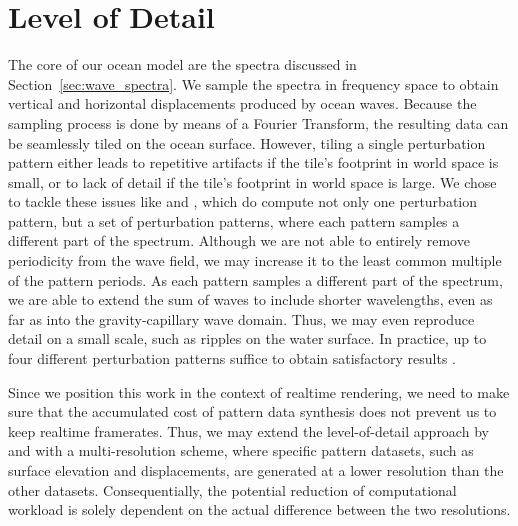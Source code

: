 \section{Level of Detail}
\label{sec:level_of_detail}
The core of our ocean model are the spectra discussed in 
Section~\ref{sec:wave_spectra}. We sample the spectra in 
frequency space to obtain vertical and horizontal displacements produced by 
ocean waves. Because the sampling process is done by means of a Fourier 
Transform, the resulting data can be seamlessly tiled on the ocean surface. 
However, tiling a single perturbation pattern either leads to repetitive 
artifacts if the tile's footprint in world space is small, or to lack of detail 
if the tile's footprint in world space is large. We chose to tackle these 
issues like \citet{misc:oceanlightingfft} and \citet{article:whitecaps},
which do compute not only one perturbation pattern, but a set of perturbation
patterns, where each pattern samples a different part of the spectrum.
Although we are not able to entirely remove periodicity from the wave field, we
may increase it to the least common multiple of the pattern periods.
As each pattern samples a different part of the spectrum, we are able
to extend the sum of waves to include shorter wavelengths, even as far as into the
gravity-capillary wave domain. Thus, we may even reproduce detail on a small
scale, such as ripples on the water surface.
In practice, up to four different perturbation patterns suffice to obtain
satisfactory results \citep{article:whitecaps}.

Since we position this work in the context of realtime rendering,
we need to make sure that the accumulated cost of pattern data synthesis
does not prevent us to keep realtime framerates. 
Thus, we may extend the level-of-detail approach by \citet{misc:oceanlightingfft} and
\citet{article:whitecaps} with a multi-resolution scheme, where specific pattern
datasets, such as surface elevation and displacements, are generated at a lower
resolution than the other datasets. 
Consequentially, the potential reduction of computational workload is solely
dependent on the actual difference between the two resolutions.



